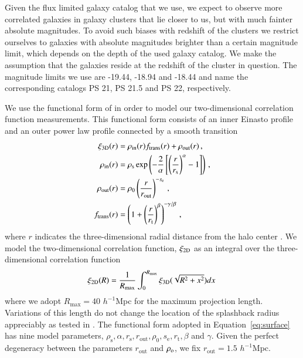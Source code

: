 \documentclass[iop, apjl, twocolappendix, numberedappendix]{emulateapj}
\begin{document}
Given the flux limited galaxy catalog that we use, we expect to
observe more correlated galaxies in galaxy clusters that lie closer
to us, but with much fainter absolute magnitudes. To avoid
such biases with redshift of the clusters we restrict ourselves to
galaxies with absolute magnitudes brighter than a certain magnitude
limit, which depends on the depth of the used galaxy catalog. We
make the assumption that the galaxies reside at the redshift of the
cluster in question. The magnitude limits we use are -19.44, -18.94 and -18.44
and name the corresponding catalogs PS 21, PS 21.5 and PS 22, respectively.

We use the functional form of \citet{diemer2014dependence} in order
to model our two-dimensional correlation function measurements. This
functional form consists of an inner Einasto profile and an outer
power law profile connected by a smooth transition
\begin{align}
\xi_{\rm 3D}(r) &= \rho_{\mathrm{in}}(r)f_{\mathrm{trans}}(r) + \rho_{\mathrm{out}}(r)\,, \label{eq:model} \\
\rho_{\mathrm{in}}(r)&=\rho_{\mathrm{s}}\exp\left( -\frac{2}{\alpha}\left[ \left( \frac{r}{r_{\mathrm{s}}}\right)^{\alpha}-1 \right] \right)\,,\\
\rho_{\mathrm{out}}(r)&=\rho_{\mathrm{0}}\left( \frac{r}{r_{\mathrm{out}}}\right)^{-s_{\mathrm{e}}} \,,\\
f_{\mathrm{trans}}(r)&=\left( 1+\left( \frac{r}{r_{\mathrm{t}}} \right)^{\beta} \right)^{-\gamma/ \beta}\,,
\label{eq:dk14}
\end{align}
where $r$ indicates the three-dimensional radial distance from the
halo center \citep{diemer2014dependence}. We model the
two-dimensional correlation function, $\xi_{\rm 2D}$ as an integral
over the three-dimensional correlation function
\begin{equation}
\xi_{\rm 2D}(R)=\frac{1}{R_{\rm max}}\int^{R_{\mathrm{max}}}_0 \xi_{\rm 3D}(\sqrt{R^2+x^2}) dx \,
\label{eq:surface}
\end{equation}
where we adopt $R_{\mathrm{max}}=40$ $h^{-1}$Mpc for the maximum projection
length. Variations of this length do not change the location of the
splashback radius appreciably as tested in
\citet{more2016detection}. The functional form adopted in
Equation~\ref{eq:surface} has nine model parameters,
$\rho_{\mathrm{s}}, \alpha, r_{\mathrm{s}}, r_{\mathrm{out}},
\rho_{\mathrm{0}}, s_{\mathrm{e}}, r_{\mathrm{t}}, \beta$ and
$\gamma$. Given the perfect degeneracy between the parameters
$r_{\mathrm{out}}$ and $\rho_{\rm o}$, we fix $r_{\mathrm{out}}=1.5$ $
h^{-1}$Mpc.
\end{document}
